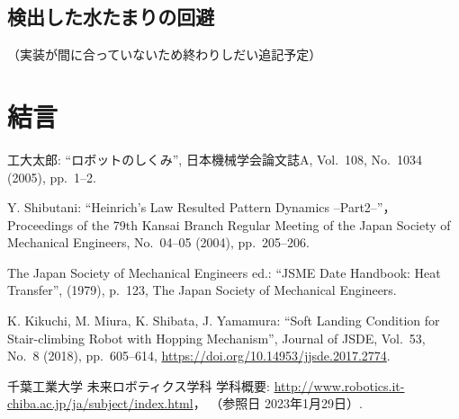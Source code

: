 \documentclass[10pt]{jarticle}
\begin{document}
    \subsection{検出した水たまりの回避}
    （実装が間に合っていないため終わりしだい追記予定）

    \section{結言}%



    



    
    
 
    \vspace{5truemm}
    {\footnotesize
        \begin{thebibliography}{99}
            
            工大太郎: ``ロボットのしくみ'', 
            日本機械学会論文誌A, 
            Vol.~108, No.~1034 (2005), pp.~1--2.
            
            Y. Shibutani: ``Heinrich's Law Resulted Pattern Dynamics --Part2--''，
            Proceedings of the 79th Kansai Branch Regular Meeting of the Japan Society of Mechanical Engineers,  
            No.~04--05 (2004), pp.~205--206.
            
            The Japan Society of Mechanical Engineers ed.: ``JSME Date Handbook: Heat Transfer'', 
            (1979), p.~123, The Japan Society of Mechanical Engineers.
            
            K. Kikuchi, M. Miura, K. Shibata, J. Yamamura: ``Soft Landing Condition for Stair-climbing Robot with Hopping Mechanism'', 
            Journal of JSDE, Vol.~53, No.~8 (2018), pp.~605--614, \url{https://doi.org/10.14953/jjsde.2017.2774}.
            
            千葉工業大学 未来ロボティクス学科 学科概要: 
            \url{http://www.robotics.it-chiba.ac.jp/ja/subject/index.html}， 
            （参照日 2023年1月29日）. 
            
        \end{thebibliography}
    }
    \normalsize
    
\end{document}
